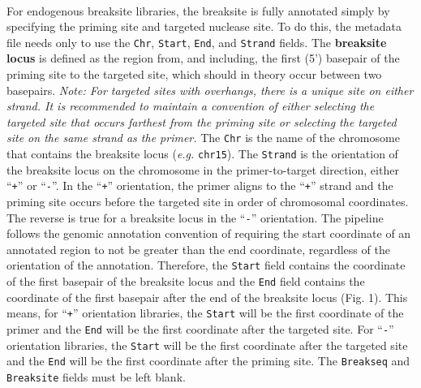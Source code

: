 \documentclass{article}
\begin{document}
\paragraph{} For endogenous breaksite libraries, the breaksite is fully annotated simply by specifying the priming site and targeted nuclease site. To do this, the metadata file needs only to use the \texttt{Chr}, \texttt{Start}, \texttt{End}, and \texttt{Strand} fields. The \textbf{breaksite locus} is defined as the region from, and including, the first (5') basepair of the priming site to the targeted site, which should in theory occur between two basepairs. \emph{Note: For targeted sites with overhangs, there is a unique site on either strand. It is recommended to maintain a convention of either selecting the targeted site that occurs farthest from the priming site or selecting the targeted site on the same strand as the primer.} The \texttt{Chr} is the name of the chromosome that contains the breaksite locus (\emph{e.g.} \texttt{chr15}). The \texttt{Strand} is the orientation of the breaksite locus on the chromosome in the primer-to-target direction, either ``\texttt{+}'' or ``\texttt{-}''. In the ``\texttt{+}'' orientation, the primer aligns to the ``\texttt{+}'' strand and the priming site occurs before the targeted site in order of chromosomal coordinates. The reverse is true for a breaksite locus in the ``\texttt{-}'' orientation. The pipeline follows the genomic annotation convention of requiring the start coordinate of an annotated region to not be greater than the end coordinate, regardless of the orientation of the annotation. Therefore, the \texttt{Start} field contains the coordinate of the first basepair of the breaksite locus and the \texttt{End} field contains the coordinate of the first basepair after the end of the breaksite locus (Fig. 1). This means, for ``\texttt{+}'' orientation libraries, the \texttt{Start} will be the first coordinate of the primer and the \texttt{End} will be the first coordinate after the targeted site. For ``\texttt{-}'' orientation libraries, the \texttt{Start} will be the first coordinate after the targeted site and the \texttt{End} will be the first coordinate after the priming site. The \texttt{Breakseq} and \texttt{Breaksite} fields must be left blank.
\end{document}
